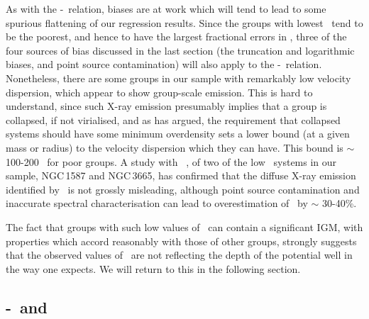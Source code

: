 \documentclass[usenatbib]{mn2e}
\begin{document}
As with the \LX-\TX\ relation, biases are at work which will tend to lead to
some spurious flattening of our regression results.  Since the groups with lowest
\LX\ tend to be the poorest, and hence to have the largest fractional errors in
\sigmav, three of the four sources of bias discussed in the last section (the
truncation and logarithmic biases, and point source contamination) will also
apply to the \LX-\sigmav\ relation.  Nonetheless, there are some groups in our
sample with remarkably low velocity dispersion, which appear to show group-scale
emission.  This is hard to understand, since such X-ray emission presumably
implies that a group is collapsed, if not virialised, and as \citet{mamon94} has
argued, the requirement that collapsed systems should have some minimum
overdensity sets a lower bound (at a given mass or radius) to the velocity
dispersion which they can have.  This bound is $\sim$ 100-200 \kmps\ for poor
groups.  A study with \Chandra\ \citep{helsdon04}, of two of the low \sigmav\
systems in our sample, NGC\,1587 and NGC\,3665, has confirmed that the diffuse
X-ray emission identified by \ROSAT\ is not grossly misleading, although point
source contamination and inaccurate spectral characterisation can lead to
overestimation of \LX\ by $\sim$ 30-40\%.

The fact that groups with such low values of \sigmav\ can contain a significant
IGM, with properties which accord reasonably with those of other groups, strongly
suggests that the observed values of \sigmav\ are not reflecting the depth of the
potential well in the way one expects.  We will return to this in the following
section.


\subsection{\sigmav-\TX\ and \betaspec}
\label{subsec_sigT}
\end{document}
